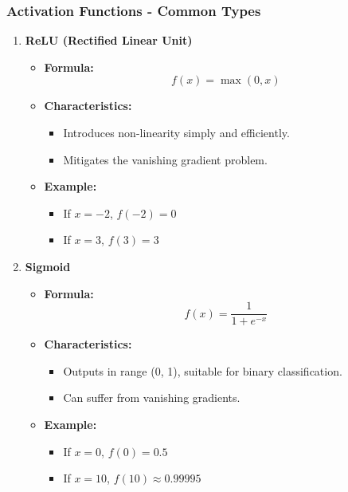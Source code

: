 \documentclass[aspectratio=169]{beamer}
\begin{document}
\begin{frame}[fragile]
  \frametitle{Activation Functions - Common Types}
  \begin{enumerate}
    \item \textbf{ReLU (Rectified Linear Unit)}
      \begin{itemize}
        \item \textbf{Formula:} 
        \[
        f(x) = \max(0, x)
        \]
        \item \textbf{Characteristics:}
        \begin{itemize}
          \item Introduces non-linearity simply and efficiently.
          \item Mitigates the vanishing gradient problem.
        \end{itemize}
        \item \textbf{Example:}
        \begin{itemize}
          \item If \( x = -2 \), \( f(-2) = 0 \)
          \item If \( x = 3 \), \( f(3) = 3 \)
        \end{itemize}
      \end{itemize}
      
    \item \textbf{Sigmoid}
      \begin{itemize}
        \item \textbf{Formula:}
        \[
        f(x) = \frac{1}{1 + e^{-x}}
        \]
        \item \textbf{Characteristics:}
        \begin{itemize}
          \item Outputs in range (0, 1), suitable for binary classification.
          \item Can suffer from vanishing gradients.
        \end{itemize}
        \item \textbf{Example:}
        \begin{itemize}
          \item If \( x = 0 \), \( f(0) = 0.5 \)
          \item If \( x = 10 \), \( f(10) \approx 0.99995 \)
        \end{itemize}
      \end{itemize}
  \end{enumerate}
\end{frame}
\end{document}

